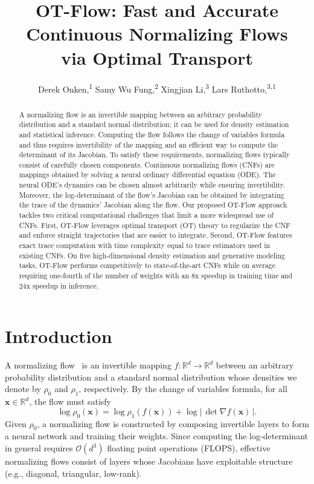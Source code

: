 \documentclass[letterpaper]{article}
\title{OT-Flow: Fast and Accurate Continuous Normalizing Flows \\ via Optimal Transport}
\author{
	Derek Onken,\textsuperscript{\rm 1}
	Samy Wu Fung,\textsuperscript{\rm 2}
	Xingjian Li,\textsuperscript{\rm 3}
	Lars Ruthotto,\textsuperscript{\rm 3,1}
    \\
}
\newcommand{\bfx}{\boldsymbol{x}}
\newcommand{\R}{\ensuremath{\mathds{R}}}
\newcommand{\bigO}{\ensuremath{\mathcal{O}}}
\newcommand{\bbR}{\R}
\begin{document}
\maketitle



\begin{abstract}
	A normalizing flow is an invertible mapping between an arbitrary probability distribution and a standard normal distribution; it can be used for density estimation and statistical inference. Computing the flow follows the change of variables formula and thus requires invertibility of the mapping and an efficient way to compute the determinant of its Jacobian. To satisfy these requirements, normalizing flows typically consist of carefully chosen components. Continuous normalizing flows (CNFs) are mappings obtained by solving a neural ordinary differential equation (ODE). The neural ODE's dynamics can be chosen almost arbitrarily while ensuring invertibility. Moreover, the log-determinant of the flow's Jacobian can be obtained by integrating the trace of the dynamics' Jacobian along the flow. Our proposed OT-Flow approach tackles two critical computational challenges that limit a more widespread use of CNFs. First, OT-Flow leverages optimal transport (OT) theory to regularize the CNF and enforce straight trajectories that are easier to integrate.	Second, OT-Flow features exact trace computation with time complexity equal to trace estimators used in existing CNFs. On five high-dimensional density estimation and generative modeling tasks, OT-Flow performs competitively to state-of-the-art CNFs while on average requiring one-fourth of the number of weights with an 8x speedup in training time and 24x speedup in inference.
\end{abstract}


\section{Introduction} 
\label{sec:intro}

	A normalizing flow~\cite{rezende2015} is an invertible mapping $f \colon \bbR^d \to \bbR^d$ between an arbitrary probability distribution and a standard normal distribution whose densities we denote by $\rho_0$ and $\rho_1$, respectively.
	By the change of variables formula, for all $\bfx \in \R^d$, the flow must satisfy~\cite{rezende2015,papamakarios2019normalizing}%
	\begin{equation} \label{eq:finite_flow}%
		\log \rho_0(\bfx) = \log \rho_1(f(\bfx)) + \log \left| \, \det \nabla f(\bfx) \,  \right| .
	\end{equation}%
	Given $\rho_0$, a normalizing flow is constructed by composing invertible layers to form a neural network and training their weights.
	Since computing the log-determinant in general requires $\bigO(d^3)$ floating point operations (FLOPS), effective normalizing flows consist of layers whose Jacobians have exploitable structure (e.g., diagonal, triangular, low-rank). 
	
\end{document}
